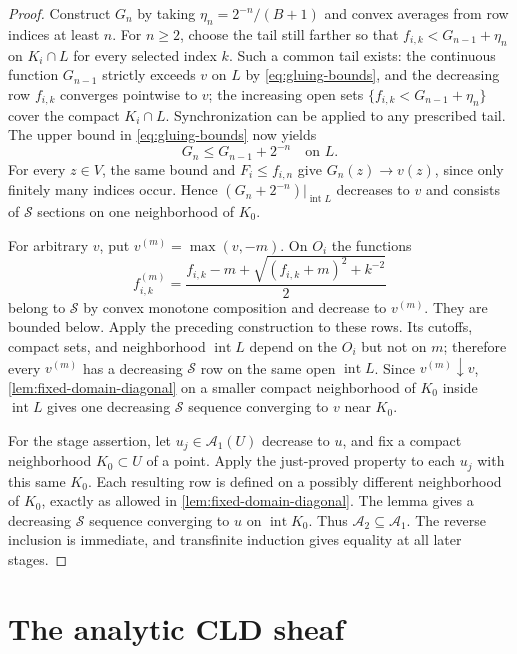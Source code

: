 \documentclass[11pt,a4paper]{amsart}
\begin{document}
\begin{proof}
Construct $G_n$ by taking $\eta_n=2^{-n}/(B+1)$ and convex averages from row indices at least $n$. For $n\geq2$, choose the tail still farther so that $f_{i,k}<G_{n-1}+\eta_n$ on $K_i\cap L$ for every selected index $k$. Such a common tail exists: the continuous function $G_{n-1}$ strictly exceeds $v$ on $L$ by \eqref{eq:gluing-bounds}, and the decreasing row $f_{i,k}$ converges pointwise to $v$; the increasing open sets $\{f_{i,k}<G_{n-1}+\eta_n\}$ cover the compact $K_i\cap L$. Synchronization can be applied to any prescribed tail. The upper bound in \eqref{eq:gluing-bounds} now yields
\[
G_n\leq G_{n-1}+2^{-n}\quad\text{on }L.
\]
For every $z\in V$, the same bound and $F_i\leq f_{i,n}$ give $G_n(z)\to v(z)$, since only finitely many indices occur. Hence $(G_n+2^{-n})|_{\operatorname{int}L}$ decreases to $v$ and consists of $\mathscr{S}$ sections on one neighborhood of $K_0$.

For arbitrary $v$, put $v^{(m)}=\max(v,-m)$. On $O_i$ the functions
\[
f_{i,k}^{(m)}=\frac{f_{i,k}-m+\sqrt{(f_{i,k}+m)^2+k^{-2}}}{2}
\]
belong to $\mathscr{S}$ by convex monotone composition and decrease to $v^{(m)}$. They are bounded below. Apply the preceding construction to these rows. Its cutoffs, compact sets, and neighborhood $\operatorname{int}L$ depend on the $O_i$ but not on $m$; therefore every $v^{(m)}$ has a decreasing $\mathscr{S}$ row on the same open $\operatorname{int}L$. Since $v^{(m)}\downarrow v$, \cref{lem:fixed-domain-diagonal} on a smaller compact neighborhood of $K_0$ inside $\operatorname{int}L$ gives one decreasing $\mathscr{S}$ sequence converging to $v$ near $K_0$.

For the stage assertion, let $u_j\in\mathscr{A}_1(U)$ decrease to $u$, and fix a compact neighborhood $K_0\subset U$ of a point. Apply the just-proved property to each $u_j$ with this same $K_0$. Each resulting row is defined on a possibly different neighborhood of $K_0$, exactly as allowed in \cref{lem:fixed-domain-diagonal}. The lemma gives a decreasing $\mathscr{S}$ sequence converging to $u$ on $\operatorname{int}K_0$. Thus $\mathscr{A}_2\subseteq\mathscr{A}_1$. The reverse inclusion is immediate, and transfinite induction gives equality at all later stages.
\end{proof}

\section{The analytic CLD sheaf}
\label{sec:cld-sheaf}
\end{document}
